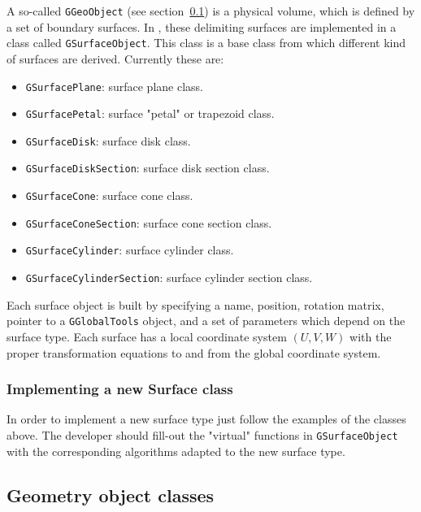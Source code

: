 A so-called {\tt GGeoObject} (see section~\ref{subsec:geoElm_class}) is a physical volume, which is defined by a set of boundary surfaces. In {\guari}, 
these delimiting surfaces are implemented in a class called {\tt GSurfaceObject}. This class is a base class from which different kind of surfaces are 
derived. Currently these are:

\begin{itemize}
  \item  {\tt GSurfacePlane}: surface plane class.
  
  \item  {\tt GSurfacePetal}: surface "petal" or trapezoid class.
  
  \item  {\tt GSurfaceDisk}: surface disk class.
  
  \item  {\tt GSurfaceDiskSection}: surface disk section class.
  
  \item  {\tt GSurfaceCone}: surface cone class.
  
  \item  {\tt GSurfaceConeSection}: surface cone section class.
  
  \item  {\tt GSurfaceCylinder}: surface cylinder class.
  
  \item  {\tt GSurfaceCylinderSection}: surface cylinder section class.
\end{itemize}

Each surface object is built by specifying a name, position, rotation matrix, pointer to a {\tt GGlobalTools} object, and a set of parameters which depend 
on the surface type. Each surface has a local coordinate system $(U,V,W)$ with the proper transformation equations to and from the global coordinate system.

\subsubsection{Implementing a new Surface class}

In order to implement a new surface type just follow the examples of the classes above. The developer should fill-out the "virtual" functions in {\tt GSurfaceObject} with the 
corresponding algorithms adapted to the new surface type.

\subsection{Geometry object classes}
\label{subsec:geoElm_class}

